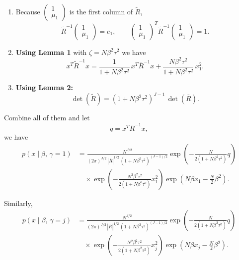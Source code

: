 \documentclass[11pt]{article}
\begin{document}
\begin{enumerate}
\item Because $\begin{pmatrix}1\\\mu_1\end{pmatrix}$ is the first column of $\tilde{R}$,
\[
\tilde{R}^{-1}\begin{pmatrix}1\\\mu_1\end{pmatrix} = e_1,
\qquad
\begin{pmatrix}1\\\mu_1\end{pmatrix}^{\!T}
\tilde{R}^{-1}
\begin{pmatrix}1\\\mu_1\end{pmatrix} = 1.
\]

\item \textbf{Using Lemma 1} with $\zeta = N\beta^2\tau^2$ we have
\[
x^T\tilde{R}^{-1}x
= \frac{1}{1+N\beta^2\tau^2}\,x^T\bar{R}^{-1}x
  + \frac{N\beta^2\tau^2}{1+N\beta^2\tau^2}\,x_1^2.
\]


\item \textbf{Using Lemma 2:}
\[
\det(\tilde{R}) = (1+N\beta^2\tau^2)^{J-1}\,\det(\bar{R}).
\]
\end{enumerate}

\medskip
\noindent Combine all of them and let
\[
q = x^T\bar{R}^{-1}x,
\]
we have
\begin{align*}
p(x \mid \beta,\,\gamma=1)
&= \frac{N^{J/2}}{(2\pi)^{J/2}\,|\bar{R}|^{1/2}\,(1+N\beta^2\tau^2)^{(J-1)/2}}
\exp\!\left(-\frac{N}{2(1+N\beta^2\tau^2)}q\right) \\
&\quad\times
\exp\!\left(-\frac{N^2\beta^2\tau^2}{2(1+N\beta^2\tau^2)}x_1^2\right)
\exp\!\left(N\beta x_1 - \frac{N}{2}\beta^2\right).
\end{align*}

\noindent Similarly,
\begin{align}\label{eq:conditional-prob-x-given-beta-gamma}
p(x \mid \beta,\,\gamma=j)
&= \frac{N^{J/2}}{(2\pi)^{J/2}\,|\bar{R}|^{1/2}\,(1+N\beta^2\tau^2)^{(J-1)/2}}
\exp\!\left(-\frac{N}{2(1+N\beta^2\tau^2)}q\right) \nonumber \\
&\quad\times
\exp\!\left(-\frac{N^2\beta^2\tau^2}{2(1+N\beta^2\tau^2)}x_j^2\right)
\exp\!\left(N\beta x_j - \frac{N}{2}\beta^2\right).
\end{align}

\end{document}
